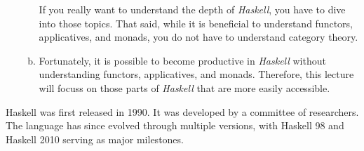 \begin{enumerate}
\begin{enumerate}[(a)]
        If you really want to understand the depth of \textsl{Haskell}, you have to dive into those topics.
        That said, while it is beneficial to understand functors, applicatives, and monads, you do not have to
        understand category theory.
  \item Fortunately, it is possible to become productive in \textsl{Haskell} without understanding 
        functors, applicatives, and monads.  Therefore, this lecture will focuss on those parts of
        \textsl{Haskell} that are more easily accessible. 
  \end{enumerate}
\end{enumerate}
Haskell was first released in 1990. It was developed by a committee of researchers.  The language has since
evolved through multiple versions, with Haskell 98 and Haskell 2010 serving as major milestones.

